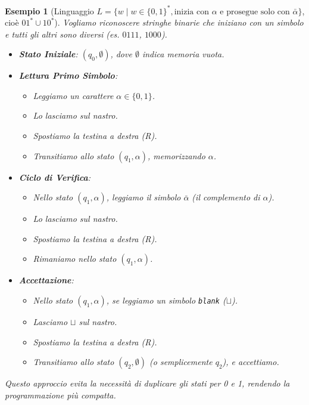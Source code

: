 \documentclass[a4paper]{article}
\newtheorem{example}{Esempio}
\begin{document}
\begin{example}[Linguaggio $L = \{w \mid w \in \{0,1\}^*, \text{inizia con } \alpha \text{ e prosegue solo con } \bar{\alpha} \}$, cioè $01^* \cup 10^*$]
Vogliamo riconoscere stringhe binarie che iniziano con un simbolo e tutti gli altri sono diversi (es. $0111$, $1000$).
\begin{itemize}
    \item \textbf{Stato Iniziale}: $(q_0, \emptyset)$, dove $\emptyset$ indica memoria vuota.
    \item \textbf{Lettura Primo Simbolo}:
        \begin{itemize}
            \item Leggiamo un carattere $\alpha \in \{0,1\}$.
            \item Lo lasciamo sul nastro.
            \item Spostiamo la testina a destra (R).
            \item Transitiamo allo stato $(q_1, \alpha)$, memorizzando $\alpha$.
        \end{itemize}
    \item \textbf{Ciclo di Verifica}:
        \begin{itemize}
            \item Nello stato $(q_1, \alpha)$, leggiamo il simbolo $\bar{\alpha}$ (il complemento di $\alpha$).
            \item Lo lasciamo sul nastro.
            \item Spostiamo la testina a destra (R).
            \item Rimaniamo nello stato $(q_1, \alpha)$.
        \end{itemize}
    \item \textbf{Accettazione}:
        \begin{itemize}
            \item Nello stato $(q_1, \alpha)$, se leggiamo un simbolo \texttt{blank} ($\sqcup$).
            \item Lasciamo $\sqcup$ sul nastro.
            \item Spostiamo la testina a destra (R).
            \item Transitiamo allo stato $(q_2, \emptyset)$ (o semplicemente $q_2$), e accettiamo.
        \end{itemize}
\end{itemize}
Questo approccio evita la necessità di duplicare gli stati per 0 e 1, rendendo la programmazione più compatta.
\end{example}
\end{document}
